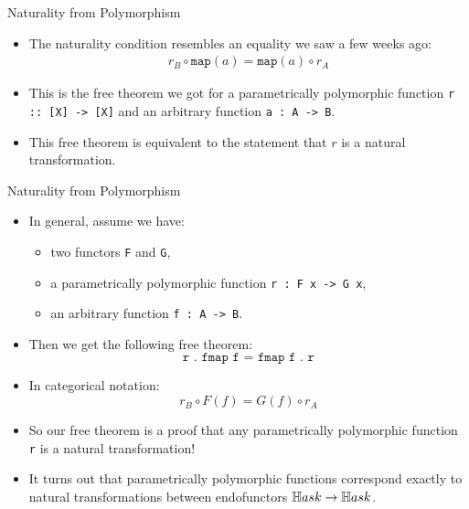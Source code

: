 \begin{frame}{Naturality from Polymorphism}
	\begin{itemize}
		\item The naturality condition resembles an equality we saw a few weeks ago:
		\begin{align*}
			r_B \circ \texttt{map}(a) = \texttt{map}(a) \circ r_A
		\end{align*}
		\pause \item This is the free theorem we got for a parametrically polymorphic function \texttt{r :: [X] -> [X]} and an arbitrary function \texttt{a : A -> B}.
		\pause \item This free theorem is equivalent to the statement that $r$ is a natural transformation.
	\end{itemize}
\end{frame}
\begin{frame}{Naturality from Polymorphism}
    \begin{itemize}
      \item In general, assume we have:
      \begin{itemize}
        \pause\item two functors \texttt{F} and \texttt{G},
        \pause\item a parametrically polymorphic function \texttt{r : F x -> G x},
        \pause\item an arbitrary function \texttt{f : A -> B}.
      \end{itemize}
      \pause\item Then we get the following free theorem:
      \begin{equation*}
       \texttt{r . fmap f = fmap f . r}
      \end{equation*}
      \vspace{-18pt}
      \pause\item In categorical notation:
      \begin{equation*}
        r_B \circ F(f) = G(f) \circ r_A
      \end{equation*}
      \vspace{-18pt}
      \pause\item So our free theorem is a proof that any parametrically polymorphic function \texttt{r} is a natural transformation!
      \pause\item It turns out that parametrically polymorphic functions correspond exactly to natural transformations between endofunctors $\mathbb{H}ask \to \mathbb{H}ask$.
    \end{itemize}
\end{frame}
